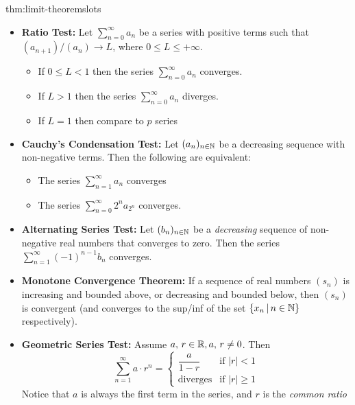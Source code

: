 \documentclass[landscape, 8pt]{extarticle}
\begin{document}
\begin{multicols}{3}
\begin{thm}{thm:limit-theorems}{lots}
\begin{itemize}
    \item \textbf{Ratio Test:} Let $\sum_{n=0}^{\infty}  a_n$ be a series with positive terms such that $(a_{n+1}) / (a_n) \to L$, where $0\le L \le +\infty$.
    \renewcommand\labelitemi{\tiny$\bullet$}
    \vspace{-5pt}
    \begin{itemize}
        \setlength\itemsep{0em}
        \item If $0\le L < 1$ then the series $\sum_{n=0}^{\infty}  a_n$ converges.
        \item If $L > 1$ then the series $\sum_{n=0}^{\infty}  a_n$ diverges.
        \item If $L = 1$ then compare to $p$ series
    \end{itemize}
    \vspace{-5pt}

    \item \textbf{Cauchy's Condensation Test:} Let $(a_n)_{n\in\mathbb{N}}$ be a decreasing sequence with non-negative terms. Then the following are equivalent:
    \vspace{-5pt}
    \renewcommand\labelitemi{\tiny$\bullet$}
    \begin{itemize}
        \setlength\itemsep{0em}
        \item The series $\sum_{n=1}^{\infty}  a_n$ converges
        \item The series $\sum_{n=0}^{\infty}  2^na_{2^n}$ converges.
    \end{itemize}
    \vspace{-5pt}

    \item \textbf{Alternating Series Test:} Let $(b_n)_{n\in\mathbb{N}}$ be a \textit{decreasing} sequence of non-negative real numbers that converges to zero. Then the series $\sum_{n=1}^{\infty} (-1)^{n-1}b_n$ converges.
    
    \item \textbf{Monotone Convergence Theorem:} If a sequence of real numbers $(s_{n})$ is increasing and bounded above, or decreasing and bounded below, then $(s_{n})$ is convergent (and converges to the sup/inf of the set $\{x_{n}\,\vert\,n\in\mathbb{N}\}$ respectively).
    
    \item \textbf{Geometric Series Test:} Assume $a,\,r\in\mathbb{R}, a,\,r\ne 0$. Then
    \[\displaystyle\sum_{n=1}^{\infty} a\cdot r^n = \begin{cases}
    \dfrac{a}{1-r} &\text{if } \lvert r \rvert < 1 \\
    \text{diverges} &\text{if } \lvert r \rvert \ge 1
    \end{cases}
    \]
    Notice that $a$ is always the first term in the series, and $r$ is the \textit{common ratio}
    \vspace{-1pt}
\end{itemize}
\end{thm}
\vspace{-5pt}


\end{multicols}
\end{document}
